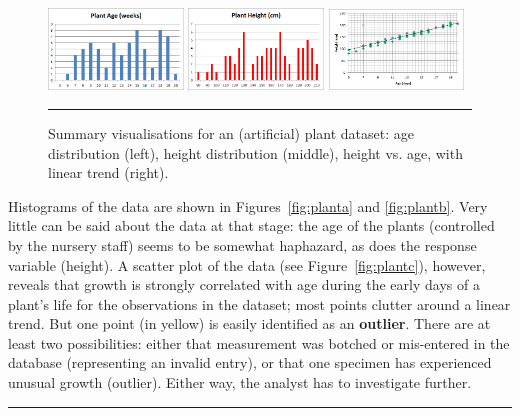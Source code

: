 \begin{figure}[t]
\centering
\includegraphics[width=0.32\textwidth]{Images/plant_age}\quad
\includegraphics[width=0.32\textwidth]{Images/plant_height}\quad
\includegraphics[width=0.32\textwidth]{Images/plant_height_vs_age}
\caption[\small Summary visualisations for a plant dataset]{\small Summary visualisations for an (artificial) plant dataset: age distribution (left), height distribution (middle), height vs. age, with linear trend (right).}\hrule \label{fig:plant_data}
\end{figure}
Histograms of the data are shown in Figures~\ref{fig:planta} and \ref{fig:plantb}. Very little can be said about the data at that stage: the age of the plants (controlled by the nursery staff) seems to be somewhat haphazard, as does the response variable (height). A scatter plot of the data (see Figure~\ref{fig:plantc}), however, reveals that growth is strongly correlated with age during the early days of a plant's life for the observations in the dataset; most points clutter around a linear trend. But one point (in yellow) is easily identified as an \textbf{outlier}. There are at least two possibilities: either that measurement was botched or mis-entered in the database (representing an invalid entry), or that one specimen has experienced unusual growth (outlier). Either way, the analyst has to investigate further.  
\begin{center}
    \rule{0.5\textwidth}{.4pt}
\end{center}
